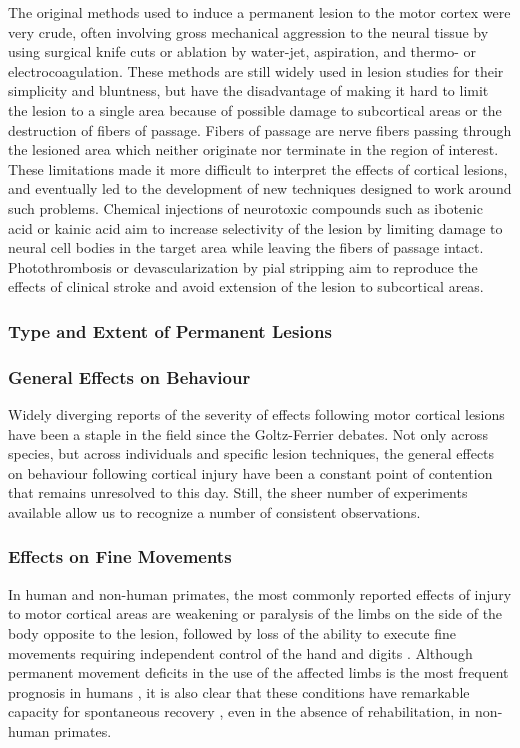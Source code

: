 The original methods used to induce a permanent lesion to the motor cortex were very crude, often involving gross mechanical aggression to the neural tissue by using surgical knife cuts or ablation by water-jet, aspiration, and thermo- or electrocoagulation. These methods are still widely used in lesion studies for their simplicity and bluntness, but have the disadvantage of making it hard to limit the lesion to a single area because of possible damage to subcortical areas or the destruction of fibers of passage. Fibers of passage are nerve fibers passing through the lesioned area which neither originate nor terminate in the region of interest. These limitations made it more difficult to interpret the effects of cortical lesions, and eventually led to the development of new techniques designed to work around such problems. Chemical injections of neurotoxic compounds such as ibotenic acid or kainic acid aim to increase selectivity of the lesion by limiting damage to neural cell bodies in the target area while leaving the fibers of passage intact. Photothrombosis \cite{Watson1985} or devascularization by pial stripping aim to reproduce the effects of clinical stroke and avoid extension of the lesion to subcortical areas.

\subsubsection{Type and Extent of Permanent Lesions}

\subsubsection{General Effects on Behaviour}

Widely diverging reports of the severity of effects following motor cortical lesions have been a staple in the field since the Goltz-Ferrier debates. Not only across species, but across individuals and specific lesion techniques, the general effects on behaviour following cortical injury have been a constant point of contention that remains unresolved to this day. Still, the sheer number of experiments available allow us to recognize a number of consistent observations.

\subsubsection{Effects on Fine Movements}

In human and non-human primates, the most commonly reported effects of injury to motor cortical areas are weakening or paralysis of the limbs on the side of the body opposite to the lesion, followed by loss of the ability to execute fine movements requiring independent control of the hand and digits \cite{Ferrier1884,Lashley1924,Glees1950,Darling2011,Xu2015}. Although permanent movement deficits in the use of the affected limbs is the most frequent prognosis in humans \cite{Kwakkel2003}, it is also clear that these conditions have remarkable capacity for spontaneous recovery \cite{GrahamBrown1913,Leyton1917,Darling2011}, even in the absence of rehabilitation, in non-human primates.

